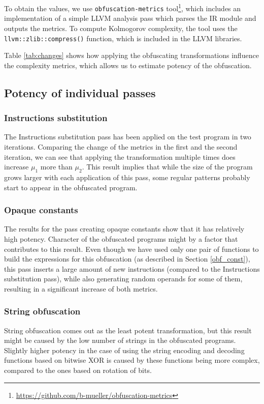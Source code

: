 \documentclass[
  digital, %
  notable,   %
  twoside, %
  nolof,     %
  nolot,     %
]{fithesis3}
\theoremstyle{definition}
\begin{document}
To obtain the values, we use \texttt{obfuscation-metrics} tool\footnote{\url{https://github.com/b-mueller/obfuscation-metrics}}, which includes an implementation of a simple LLVM analysis pass which parses the IR module and outputs the metrics. To compute Kolmogorov complexity, the tool uses the \texttt{llvm::zlib::compress()} function, which is included in the LLVM libraries. 

Table \ref{tab:changes} shows how applying the obfuscating transformations influence the complexity metrics, which allows us to estimate potency of the obfuscation. 

\subsection{Potency of individual passes}

\subsubsection{Instructions substitution}
The Instructions substitution pass has been applied on the test program in two iterations. Comparing the change of the metrics in the first and the second iteration, we can see that applying the transformation multiple times does increase $\mu_1$ more than $\mu_2$. This result implies that while the size of the program grows larger with each application of this pass, some regular patterns probably start to appear in the obfuscated program.

\subsubsection{Opaque constants}
The results for the pass creating opaque constants show that it has relatively high potency. Character of the obfuscated programs might by a factor that contributes to this result. Even though we have used only one pair of functions to build the expressions for this obfuscation (as described in Section \ref{obf_const}), this pass inserts a large amount of new instructions (compared to the Instructions substitution pass), while also generating random operands for some of them, resulting in a significant increase of both metrics. 

\subsubsection{String obfuscation}
String obfuscation comes out as the least potent transformation, but this result might be caused by the low number of strings in the obfuscated programs. Slightly higher potency in the case of using the string encoding and decoding functions based on bitwise XOR is caused by these functions being more complex, compared to the ones based on rotation of bits. 
\end{document}
